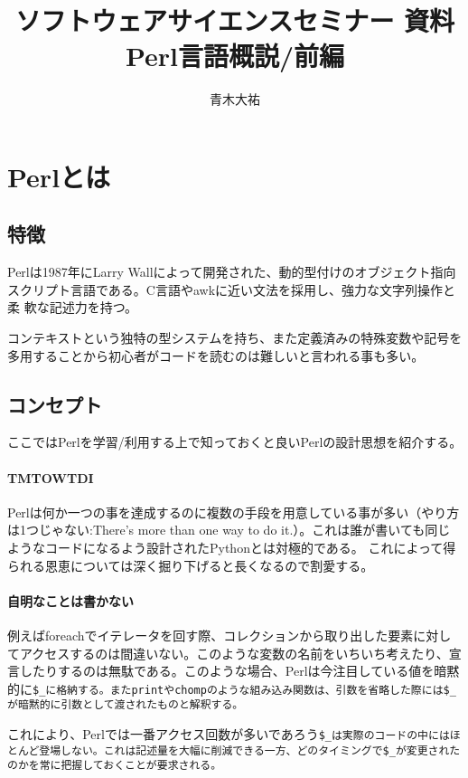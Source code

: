 \documentclass[a4paper,9pt]{jarticle}
\title{ソフトウェアサイエンスセミナー 資料 \\{\large{Perl言語概説/前編}}}
\author{青木大祐}
\begin{document}
\maketitle

\section{Perlとは}

\subsection{特徴}
Perlは1987年にLarry Wallによって開発された、動的型付けのオブジェクト指向
スクリプト言語である。C言語やawkに近い文法を採用し、強力な文字列操作と柔
軟な記述力を持つ。

コンテキストという独特の型システムを持ち、また定義済みの特殊変数や記号を
多用することから初心者がコードを読むのは難しいと言われる事も多い。

\subsection{コンセプト}
ここではPerlを学習/利用する上で知っておくと良いPerlの設計思想を紹介する。

\paragraph{TMTOWTDI}
Perlは何か一つの事を達成するのに複数の手段を用意している事が多い（やり方は1つじゃない:There's more than one way to do it.）。これは誰が書いても同じようなコードになるよう設計されたPythonとは対極的である。
これによって得られる恩恵については深く掘り下げると長くなるので割愛する。

\paragraph{自明なことは書かない}
例えばforeachでイテレータを回す際、コレクションから取り出した要素に対してアクセスするのは間違いない。このような変数の名前をいちいち考えたり、宣言したりするのは無駄である。このような場合、Perlは今注目している値を暗黙的に\tt{\$\_}に格納する。またprintやchompのような組み込み関数は、引数を省略した際には\tt{\$\_}が暗黙的に引数として渡されたものと解釈する。

これにより、Perlでは一番アクセス回数が多いであろう\tt{\$\_}は実際のコードの中にはほとんど登場しない。これは記述量を大幅に削減できる一方、どのタイミングで\tt{\$\_}が変更されたのかを常に把握しておくことが要求される。
\end{document}
